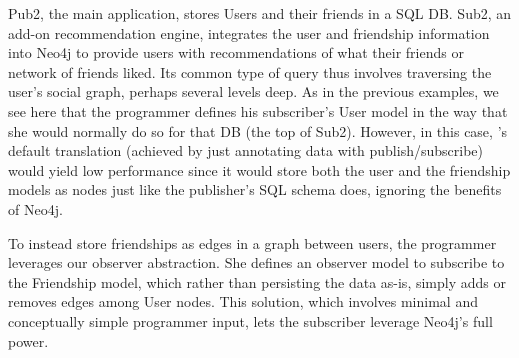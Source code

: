 Pub2, the main application, stores Users and their friends in a SQL DB.
Sub2, an add-on recommendation engine, integrates the user and friendship
information into Neo4j to provide users with recommendations of what their
friends or network of friends liked. Its common type of query thus involves
traversing the user's social graph, perhaps several levels deep.  As in the
previous examples, we see here that the programmer defines his subscriber's User
model in the way that she would normally do so for that DB (the top of
Sub2).  However, in this case, \synapse's default translation (achieved by just
annotating data with publish/subscribe) would yield low performance since it
would store both the user and the friendship models as nodes just like the
publisher's SQL schema does, ignoring the benefits of Neo4j.

To instead store friendships as edges in a graph between users, the programmer
leverages our observer abstraction.  She defines an observer model to
subscribe to the Friendship model, which rather than persisting the data as-is,
simply adds or removes edges among User nodes.  This solution, which involves
minimal and conceptually simple programmer input, lets the subscriber
leverage Neo4j's full power.

